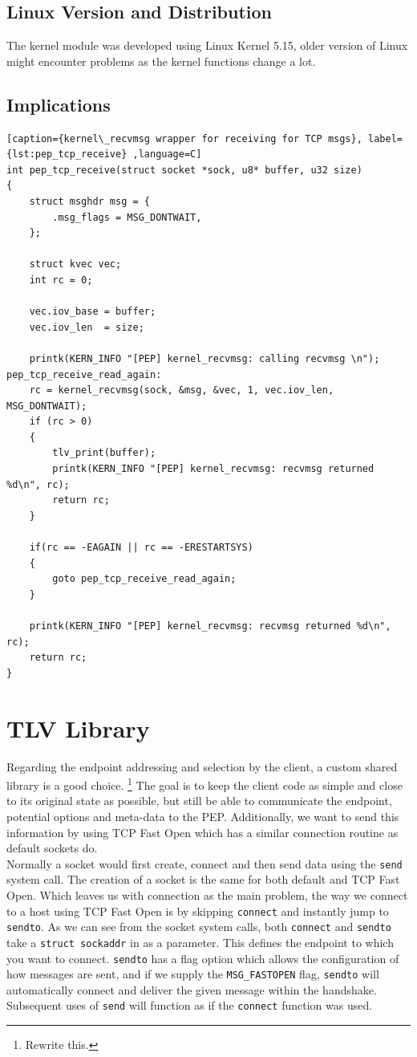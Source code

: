 \documentclass[a4paper,english, 11pt]{report}
\begin{document}
\subsection{Linux Version and Distribution}
The kernel module was developed using Linux Kernel 5.15, older version of Linux might encounter problems as the kernel functions change a lot.

\subsection{Implications}

\begin{lstlisting}[caption={kernel\_recvmsg wrapper for receiving for TCP msgs}, label={lst:pep_tcp_receive} ,language=C]
int pep_tcp_receive(struct socket *sock, u8* buffer, u32 size)
{
	struct msghdr msg = {
		.msg_flags = MSG_DONTWAIT,
	};

	struct kvec vec;
	int rc = 0;

	vec.iov_base = buffer;
	vec.iov_len  = size;

	printk(KERN_INFO "[PEP] kernel_recvmsg: calling recvmsg \n");
pep_tcp_receive_read_again:
	rc = kernel_recvmsg(sock, &msg, &vec, 1, vec.iov_len, MSG_DONTWAIT);
	if (rc > 0)
	{
		tlv_print(buffer);
		printk(KERN_INFO "[PEP] kernel_recvmsg: recvmsg returned %d\n", rc);
		return rc;
	}

	if(rc == -EAGAIN || rc == -ERESTARTSYS)
	{
		goto pep_tcp_receive_read_again;
	}

	printk(KERN_INFO "[PEP] kernel_recvmsg: recvmsg returned %d\n", rc);
	return rc;
}
\end{lstlisting}

\section{TLV Library}
Regarding the endpoint addressing and selection by the client, a custom shared library is a good choice.
\footnote{Rewrite this.} The goal is to keep the client code as simple and close to its original state as possible, but still be able to communicate the endpoint, potential options and meta-data to the PEP. Additionally, we want to send this information by using TCP Fast Open which has a similar connection routine as default sockets do.\\

Normally a socket would first create, connect and then send data using the \verb|send| system call. The creation of a socket is the same for both default and TCP Fast Open. Which leaves us with connection as the main problem, the way we connect to a host using TCP Fast Open is by skipping \verb|connect| and instantly jump to \verb|sendto|. As we can see from the socket system calls, both \verb|connect| and \verb|sendto| take a \verb|struct sockaddr| in as a parameter. This defines the endpoint to which you want to connect. \verb|sendto| has a flag option which allows the configuration of how messages are sent, and if we supply the \verb|MSG_FASTOPEN| flag, \verb|sendto| will automatically connect and deliver the given message within the handshake. Subsequent uses of \verb|send| will function as if the \verb|connect| function was used.\\
\end{document}
